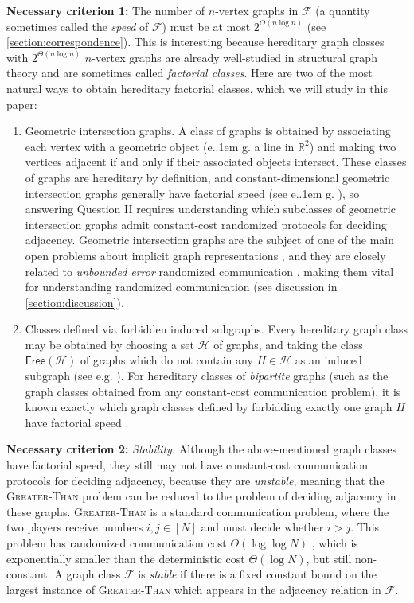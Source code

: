\documentclass{theoretics}
\makeatletter
\newcommand{\cF}{\ensuremath{\mathcal{F}}}
\newcommand{\cH}{\ensuremath{\mathcal{H}}}
\newcommand{\bR}{\ensuremath{\mathbb{R}}}
\newcommand*\eg{e.\kern.1em g.\@\xspace} %
\newcommand{\free}{\mathsf{Free}}
\makeatother
\begin{document}
\noindent
\textbf{Necessary criterion 1:} The number of $n$-vertex graphs in $\cF$ (a quantity sometimes
called the \emph{speed} of $\cF$) must be at most $2^{O(n \log n)}$ (see
\cref{section:correspondence}).  This is interesting because hereditary graph classes with
$2^{\Theta(n \log n)}$ $n$-vertex graphs are already well-studied in structural graph theory and are
sometimes called \emph{factorial classes}. Here are two of the most natural ways to obtain
hereditary factorial classes, which we will study in this paper:
\begin{enumerate}
\item Geometric intersection graphs. A class of graphs is obtained by associating each vertex with a
geometric object (\eg a line in $\bR^2$) and making two vertices adjacent if and only if their
associated objects intersect. These classes of graphs are hereditary by definition, and
constant-dimensional geometric intersection graphs generally have factorial speed (see \eg
\cite{Spin03}), so answering Question II requires understanding which subclasses of geometric
intersection graphs admit constant-cost randomized protocols for deciding adjacency. Geometric
intersection graphs are the subject of one of the main open problems about implicit graph
representations \cite{Spin03}, and they are closely related to 
\emph{unbounded error} randomized communication \cite{PS86}, making them vital for understanding
randomized communication (see discussion in \cref{section:discussion}).
\item Classes defined via forbidden induced subgraphs. Every hereditary graph class may be obtained by choosing a set
$\cH$ of graphs, and taking the class $\free(\cH)$ of graphs which do not contain any $H \in \cH$ as
an induced subgraph (see e.g. \cite[Chapter 2]{KL15}). For hereditary classes of \emph{bipartite} graphs (such as the graph classes
obtained from any constant-cost communication problem), it is known exactly which graph classes
defined by forbidding exactly one graph $H$ have factorial speed \cite{All09,LZ17}.
\end{enumerate}

\noindent\textbf{Necessary criterion 2:} \emph{Stability.}
Although the above-mentioned graph classes have factorial speed, they still may not have constant-cost
communication protocols for deciding adjacency, because they are \emph{unstable}, meaning that the
\textsc{Greater-Than} problem can be reduced to the problem of deciding adjacency in these graphs.
\textsc{Greater-Than} is a standard communication problem, where the two players receive numbers
$i,j \in [N]$ and must decide whether $i > j$. This problem has randomized communication cost
$\Theta(\log\log N)$ \cite{Nis93,Viol15}, which is exponentially smaller than the deterministic
cost $\Theta(\log N)$, but still non-constant. A graph class $\cF$ is \emph{stable} if there is a
fixed constant bound on the largest instance of \textsc{Greater-Than} which appears in the adjacency
relation in $\cF$.
\end{document}
